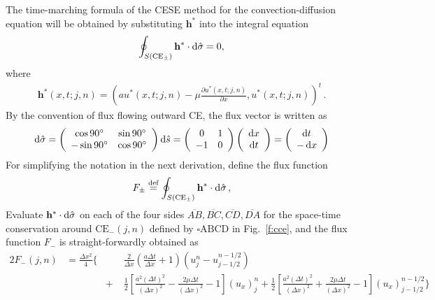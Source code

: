 \documentclass{turgon}
\begin{document}
The time-marching formula of the CESE method for the convection-diffusion
equation will be obtained by substituting $\mathbf{h}^*$ into the integral
equation
\begin{align*}
  \oint_{S(\mathrm{CE}_{\pm})}\mathbf{h}^*\cdot \mathop{}\!\mathrm{d}\hat{\sigma}=0 ,
\end{align*}
where
\begin{align*}
  \mathbf{h}^*(x,t;j,n) =
  \left(
    au^*(x,t;j,n)-\mu\frac{\partial u^*(x,t;j,n)}{\partial x}, u^*(x,t;j,n)
  \right)^t
  \,.
\end{align*}
By the convention of flux flowing outward CE, the flux vector is written as
\begin{align*}
  \mathop{}\!\mathrm{d}\hat{\sigma}
  = \left(\begin{array}{cc} \cos90^{\circ} & \sin90^{\circ} \\
                           -\sin90^{\circ} & \cos90^{\circ}
    \end{array}\right) \mathop{}\!\mathrm{d}\hat{s}
  = \left(\begin{array}{cc} 0 & 1 \\
                           -1 & 0
    \end{array}\right)
    \left(\begin{array}{c} \mathop{}\!\mathrm{d} x \\ \mathop{}\!\mathrm{d} t
    \end{array}\right)
  = \left(\begin{array}{c} \mathop{}\!\mathrm{d} t \\ - \mathop{}\!\mathrm{d} x
    \end{array}\right)
\end{align*}
For simplifying the notation in the next derivation, define the flux function
\begin{align*}
  F_{\pm} \defeq
    \oint_{S(\mathrm{CE}_{\pm})}\mathbf{h}^*\cdot \dif\hat{\sigma}
  \,,
\end{align*}
Evaluate $\mathbf{h}^*\cdot \mathop{}\!\mathrm{d}\hat{\sigma}$ on each of the four sides
$\overline{AB}, \overline{BC}, \overline{CD}, \overline{DA}$ for the space-time
conservation around $\mathrm{CE}_-(j,n)$ defined by $\square\mathrm{ABCD}$ in
Fig.~\ref{f:cce}, and the flux function $F_-$ is straight-forwardly obtained as
\begin{alignat*}{2}
  F_-(j,n) &= \frac{\Delta x^2}{4}\Big\{
    &&\frac{2}{\Delta x}\left(\frac{a\Delta t}{\Delta x}+1\right)
      \left(u_j^n-u_{j-1/2}^{n-1/2}\right) \\
  & &+\;& \frac{1}{2}\left[
          \frac{a^2(\Delta t)^2}{(\Delta x)^2}
        - \frac{2\mu\Delta t} {(\Delta x)^2} - 1
        \right](u_x)_j^n
    +     \frac{1}{2}\left[
          \frac{a^2(\Delta t)^2}{(\Delta x)^2}
        + \frac{2\mu\Delta t} {(\Delta x)^2} - 1
        \right](u_x)_{j-1/2}^{n-1/2}
    \Big\}
\end{alignat*}
\end{document}

